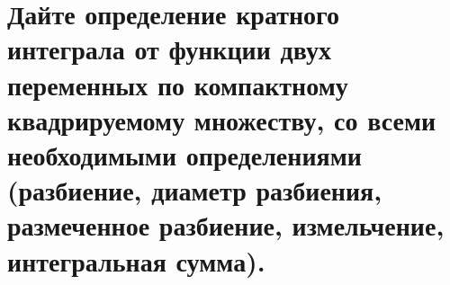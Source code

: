 \section{Дайте определение кратного интеграла от функции двух переменных по компактному квадрируемому множеству, со всеми необходимыми определениями (разбиение, диаметр разбиения, размеченное разбиение, измельчение, интегральная сумма).}